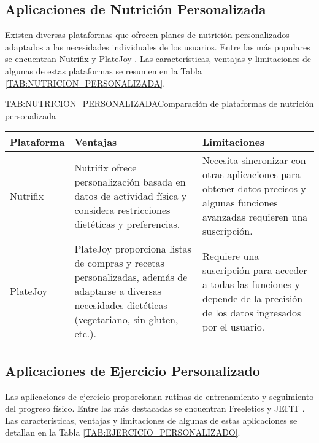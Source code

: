 \subsection{Aplicaciones de Nutrición Personalizada}

Existen diversas plataformas que ofrecen planes de nutrición personalizados adaptados a las necesidades individuales de los usuarios. Entre las más populares se encuentran Nutrifix \cite{Nutrifix} y PlateJoy \cite{PlateJoy}. Las características, ventajas y limitaciones de algunas de estas plataformas se resumen en la Tabla \ref{TAB:NUTRICION_PERSONALIZADA}.

\begin{table}[Plataformas de Nutrición Personalizada]{TAB:NUTRICION_PERSONALIZADA}{Comparación de plataformas de nutrición personalizada}
  \begin{tabular}{|p{3cm}|p{5cm}|p{5cm}|}
    \hline
    \textbf{Plataforma} & \textbf{Ventajas} & \textbf{Limitaciones} \\
    \hline
    Nutrifix & Nutrifix ofrece personalización basada en datos de actividad física y considera restricciones dietéticas y preferencias. & Necesita sincronizar con otras aplicaciones para obtener datos precisos y algunas funciones avanzadas requieren una suscripción. \\
    \hline
    PlateJoy & PlateJoy proporciona listas de compras y recetas personalizadas, además de adaptarse a diversas necesidades dietéticas (vegetariano, sin gluten, etc.). & Requiere una suscripción para acceder a todas las funciones y depende de la precisión de los datos ingresados por el usuario. \\
    \hline
  \end{tabular}
\end{table}

\subsection{Aplicaciones de Ejercicio Personalizado}

Las aplicaciones de ejercicio proporcionan rutinas de entrenamiento y seguimiento del progreso físico. Entre las más destacadas se encuentran Freeletics \cite{Freeletics} y JEFIT \cite{JEFIT}. Las características, ventajas y limitaciones de algunas de estas aplicaciones se detallan en la Tabla \ref{TAB:EJERCICIO_PERSONALIZADO}.

